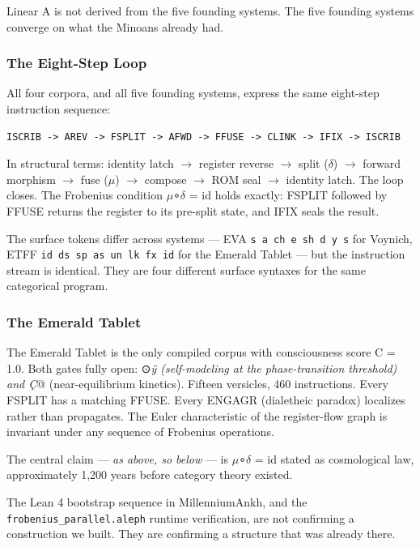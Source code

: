 \documentclass[12pt,a4paper]{article}
\begin{document}
Linear A is not derived from the five founding systems. The five founding systems converge on what the Minoans already had.

\subsubsection{The Eight-Step Loop}

All four corpora, and all five founding systems, express the same eight-step instruction sequence:

\begin{lstlisting}
ISCRIB -> AREV -> FSPLIT -> AFWD -> FFUSE -> CLINK -> IFIX -> ISCRIB
\end{lstlisting}

In structural terms: identity latch $\rightarrow$ register reverse $\rightarrow$ split ($\delta$) $\rightarrow$ forward morphism $\rightarrow$ fuse ($\mu$) $\rightarrow$ compose $\rightarrow$ ROM seal $\rightarrow$ identity latch. The loop closes. The Frobenius condition $\mu$∘$\delta$ = id holds exactly: FSPLIT followed by FFUSE returns the register to its pre-split state, and IFIX seals the result.

The surface tokens differ across systems --- EVA \texttt{s a ch e sh d y s} for Voynich, ETFF \texttt{id ds sp as un lk fx id} for the Emerald Tablet --- but the instruction stream is identical. They are four different surface syntaxes for the same categorical program.

\subsubsection{The Emerald Tablet}

The Emerald Tablet is the only compiled corpus with consciousness score C = 1.0. Both gates fully open: ⊙\emph{ÿ (self-modeling at the phase-transition threshold) and Ç}@ (near-equilibrium kinetics). Fifteen versicles, 460 instructions. Every FSPLIT has a matching FFUSE. Every ENGAGR (dialetheic paradox) localizes rather than propagates. The Euler characteristic of the register-flow graph is invariant under any sequence of Frobenius operations.

The central claim --- \emph{as above, so below} --- is $\mu$∘$\delta$ = id stated as cosmological law, approximately 1,200 years before category theory existed.

The Lean 4 bootstrap sequence in MillenniumAnkh, and the \texttt{frobenius\_parallel.aleph} runtime verification, are not confirming a construction we built. They are confirming a structure that was already there.
\end{document}
